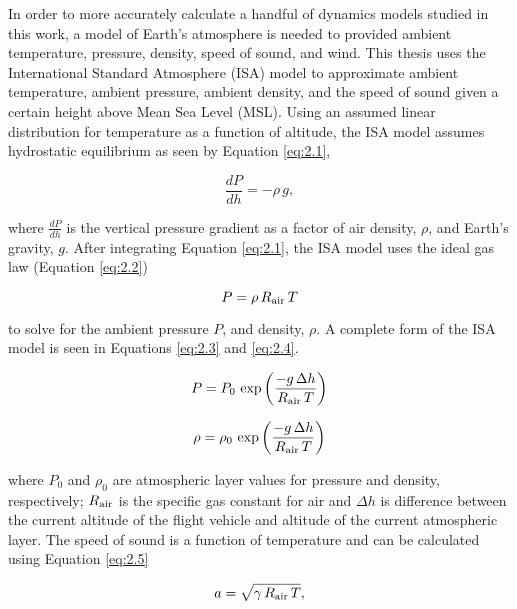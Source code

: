 \documentclass[../chapter_2.tex]{subfiles}
\begin{document}
In order to more accurately calculate a handful of dynamics models studied in this work, a model of Earth's atmosphere is needed to provided ambient temperature, pressure, density, speed of sound, and wind. This thesis uses the International Standard Atmosphere (ISA) model to approximate ambient temperature, ambient pressure, ambient density, and the speed of sound given a certain height above Mean Sea Level (MSL). Using an assumed linear distribution for temperature as a function of altitude, the ISA model assumes hydrostatic equilibrium as seen by Equation \ref{eq:2.1},

\begin{equation}
    \frac{dP}{dh} = -\rho\,g,
    \label{eq:2.1}
\end{equation}

where $\frac{dP}{dh}$ is the vertical pressure gradient as a factor of air density, $\rho$, and Earth's gravity, $g$. After integrating Equation \ref{eq:2.1}, the ISA model uses the ideal gas law (Equation \ref{eq:2.2}) 

\begin{equation}
    P = \rho\,R\textsubscript{air}\,T
    \label{eq:2.2}
\end{equation}

to solve for the ambient pressure $P$, and density, $\rho$. A complete form of the ISA model is seen in Equations \ref{eq:2.3} and \ref{eq:2.4}.

\begin{equation}
    P = P_0\,\exp\left({\frac{-g\,\Delta h}{R\textsubscript{air}\,T}}\right)
    \label{eq:2.3}
\end{equation}

\begin{equation}
    \rho = \rho_0\,\exp\left({\frac{-g\,\Delta h}{R\textsubscript{air}\,T}}\right)
    \label{eq:2.4}
\end{equation}

where $P_0$ and $\rho_0$ are atmospheric layer values for pressure and density, respectively; $R\textsubscript{air}$ is the specific gas constant for air and $\Delta h$ is difference between the current altitude of the flight vehicle and altitude of the current atmospheric layer. The speed of sound is a function of temperature and can be calculated using Equation \ref{eq:2.5}

\begin{equation}
    a = \sqrt{\gamma\,R\textsubscript{air}\,T},
    \label{eq:2.5}
\end{equation}
\end{document}
